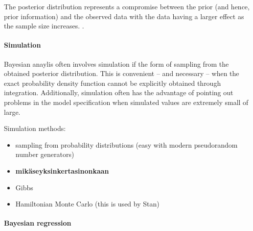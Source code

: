 The posterior distribution represents a compromise between the prior (and
hence, prior information) and the observed data with the data having a larger
effect as the sample size increases. \citep{Gelman2013}.


\paragraph{Simulation}\label{simulation}

Bayesian anaylis often involves simulation if the form of sampling from the
obtained posterior distribution. This is convenient -- and necessary -- when
the exact probability density function cannot be explicitly obtained through
integration. Additionally, simulation often has the advantage of pointing out
problems in the model specification when simulated values are extremely small
of large.

Simulation methods:
\begin{itemize}
\tightlist
  \item
  sampling from probability distributions (easy with modern pseudorandom
  number generators)
  \item
  \textbf{mikäseyksinkertasinonkaan}
  \item
  Gibbs
  \item
  Hamiltonian Monte Carlo (this is used by Stan)
\end{itemize}


\paragraph{Bayesian regression}\label{bayesian-regression}

